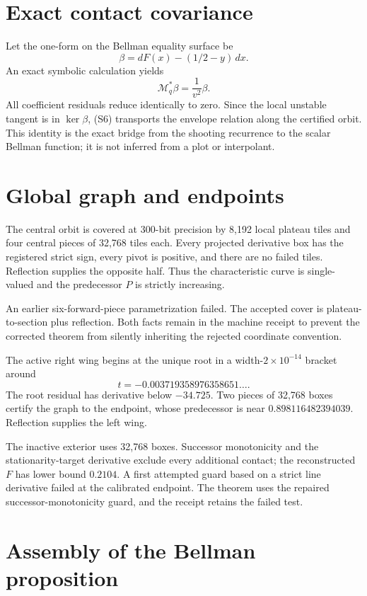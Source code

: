 \documentclass[11pt]{article}
\newcommand{\M}{\mathcal M}
\begin{document}
\section{Exact contact covariance}

Let the one-form on the Bellman equality surface be
\[
 \beta=dF(x)-(1/2-y)\,dx.
\]
An exact symbolic calculation yields
\[
 \M_q^*\beta=\frac{1}{v^2}\beta.                \tag{S6}
\]
All coefficient residuals reduce identically to zero.  Since the local
unstable tangent is in $\ker\beta$, (S6) transports the envelope relation
along the certified orbit.  This identity is the exact bridge from the
shooting recurrence to the scalar Bellman function; it is not inferred from a
plot or interpolant.

\section{Global graph and endpoints}

The central orbit is covered at 300-bit precision by 8,192 local plateau
tiles and four central pieces of 32,768 tiles each.  Every projected derivative
box has the registered strict sign, every pivot is positive, and there are no
failed tiles.  Reflection supplies the opposite half.  Thus the characteristic
curve is single-valued and the predecessor $P$ is strictly increasing.

An earlier six-forward-piece parametrization failed.  The accepted cover is
plateau-to-section plus reflection.  Both facts remain in the machine receipt
to prevent the corrected theorem from silently inheriting the rejected
coordinate convention.

The active right wing begins at the unique root in a width-$2\times10^{-14}$
bracket around
\[
 t=-0.003719358976358651\ldots .
\]
The root residual has derivative below $-34.725$.  Two pieces of 32,768 boxes
certify the graph to the endpoint, whose predecessor is near
$0.898116482394039$.  Reflection supplies the left wing.

The inactive exterior uses 32,768 boxes.  Successor monotonicity and the
stationarity-target derivative exclude every additional contact; the
reconstructed $F$ has lower bound $0.2104$.  A first attempted guard based on
a strict line derivative failed at the calibrated endpoint.  The theorem uses
the repaired successor-monotonicity guard, and the receipt retains the failed
test.

\section{Assembly of the Bellman proposition}
\end{document}
